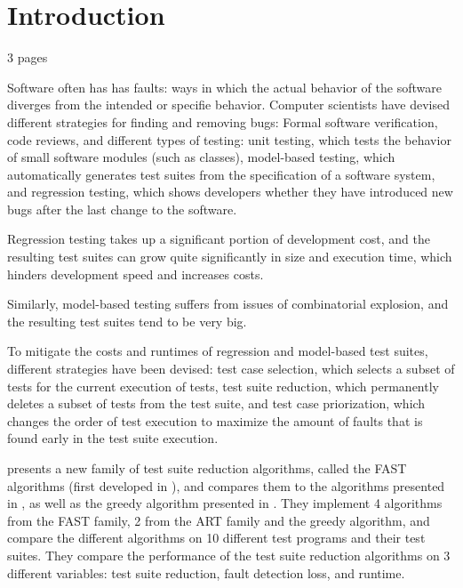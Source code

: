 
\chapter{Introduction}\label{chapter:introduction}

3 pages

Software often has has faults: ways in which the actual behavior of
the software diverges from the intended or specifie behavior. Computer
scientists have devised different strategies for finding and removing
bugs: Formal software verification, code reviews, and different types of
testing: unit testing, which tests the behavior of small software modules
(such as classes), model-based testing, which automatically generates
test suites from the specification of a software system, and regression
testing, which shows developers whether they have introduced new bugs
after the last change to the software.


Regression testing takes up a significant portion of development cost,
and the resulting test suites can grow quite significantly in size and
execution time, which hinders development speed and increases costs.

Similarly, model-based testing suffers from issues of combinatorial explosion, %
and the resulting test suites tend to be very big.

To mitigate the costs and runtimes of regression and model-based test
suites, different strategies have been devised: test case selection,
which selects a subset of tests for the current execution of tests,
test suite reduction, which permanently deletes a subset of tests from
the test suite, and test case priorization, which changes the order of
test execution to maximize the amount of faults that is found early in
the test suite execution.

\cite{cruciani2019scalable} presents a new family of test suite
reduction algorithms, called the FAST algorithms (first developed in
\cite{miranda2018fast}), and compares them to the algorithms presented
in \cite{chen2010adaptive}, as well as the greedy algorithm presented
in \cite{rothermel2001prioritizing}. They implement 4 algorithms
from the FAST family, 2 from the ART family and the greedy algorithm,
and compare the different algorithms on 10 different test programs
and their test suites. They compare the performance of the test suite
reduction algorithms on 3 different variables: test suite reduction,
fault detection loss, and runtime.

